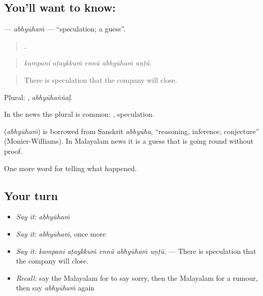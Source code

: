 \subsection*{You'll want to know: }
\textbf{} — \emph{abhyūhaṁ} — \textquotedblleft{}speculation; a guess\textquotedblright{}.

\begin{quote}
    .
\end{quote}

\begin{quote}
\emph{kampani aṭaykkuṁ ennŭ abhyūhaṁ uṇṭŭ.}
\end{quote}

\begin{quote}
There is speculation that the company will close.
\end{quote}

Plural: , \emph{abhyūhaṅṅaḷ}.

In the news the plural is common: , speculation.

\begin{cousinweb}
\textbf{} (\emph{abhyūhaṁ}) is borrowed from Sanskrit \emph{abhyūha}, \textquotedblleft{}reasoning, inference, conjecture\textquotedblright{} (Monier-Williams). In Malayalam news it is a guess that is going round without proof.
\end{cousinweb}

\begin{grammarlens}[title={What you've built}]
One more word for telling what happened.
\end{grammarlens}

\subsection*{Your turn}
\begin{itemize}
\raggedright
  \item \emph{Say it:} \emph{abhyūhaṁ}
  \item \emph{Say it:} \emph{abhyūhaṁ}, once more
  \item \emph{Say it:} \emph{kampani aṭaykkuṁ ennŭ abhyūhaṁ uṇṭŭ.} — There is speculation that the company will close.
  \item \emph{Recall:} say the Malayalam for to say sorry, then the Malayalam for a rumour, then say \emph{abhyūhaṁ} again
\end{itemize}

